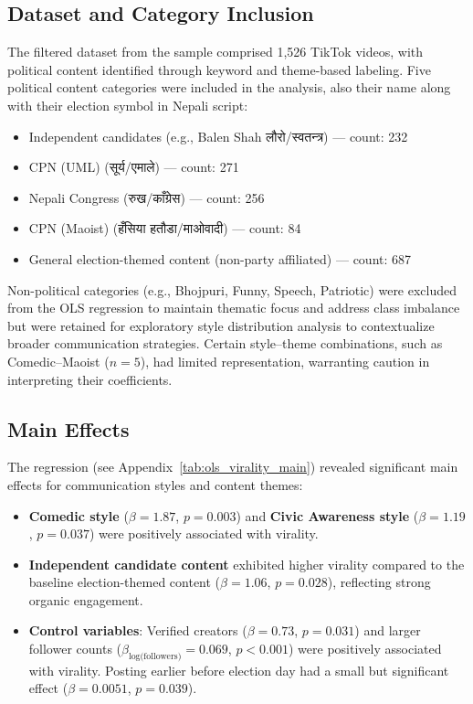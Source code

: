 \documentclass[12pt,a4paper]{report}
\begin{document}
\subsection{Dataset and Category Inclusion}
The filtered dataset from the sample comprised 1,526 TikTok videos, with political content identified through keyword and theme-based labeling. Five political content categories were included in the analysis, also their name along with their election symbol in Nepali script:
\begin{itemize}[noitemsep]
    \item Independent candidates (e.g., Balen Shah \texthindi{लौरो/स्वतन्त्र}) — count: 232
    \item CPN (UML) (\texthindi{सूर्य/एमाले}) — count: 271
    \item Nepali Congress (\texthindi{रुख/काँग्रेस}) — count: 256
    \item CPN (Maoist) (\texthindi{हँसिया हतौडा/माओवादी}) — count: 84
    \item General election-themed content (non-party affiliated) — count: 687
\end{itemize}
Non-political categories (e.g., Bhojpuri, Funny, Speech, Patriotic) were excluded from the OLS regression to maintain thematic focus and address class imbalance but were retained for exploratory style distribution analysis to contextualize broader communication strategies. Certain style--theme combinations, such as Comedic--Maoist (\( n = 5 \)), had limited representation, warranting caution in interpreting their coefficients.

\subsection{Main Effects}
The regression (see Appendix~\ref{tab:ols_virality_main}) revealed significant main effects for communication styles and content themes:
\begin{itemize}[noitemsep]
    \item \textbf{Comedic style} (\( \beta = 1.87 \), \( p = 0.003 \)) and \textbf{Civic Awareness style} (\( \beta = 1.19 \), \( p = 0.037 \)) were positively associated with virality.
    \item \textbf{Independent candidate content} exhibited higher virality compared to the baseline election-themed content (\( \beta = 1.06 \), \( p = 0.028 \)), reflecting strong organic engagement.
    \item \textbf{Control variables}: Verified creators (\( \beta = 0.73 \), \( p = 0.031 \)) and larger follower counts (\( \beta_{\text{log(followers)}} = 0.069 \), \( p < 0.001 \)) were positively associated with virality. Posting earlier before election day had a small but significant effect (\( \beta = 0.0051 \), \( p = 0.039 \)).
\end{itemize}
\end{document}
